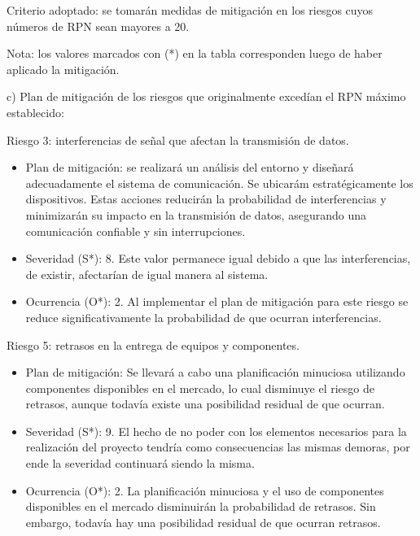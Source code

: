\documentclass[
11pt, %
]{charter}
\begin{document}
Criterio adoptado: se tomarán medidas de mitigación en los riesgos cuyos números de RPN sean mayores a 20.

Nota: los valores marcados con (*) en la tabla corresponden luego de haber aplicado la mitigación.


c) Plan de mitigación de los riesgos que originalmente excedían el RPN máximo establecido:
 

Riesgo 3: interferencias de señal que afectan la transmisión de datos.
\begin{itemize}
	\item Plan de mitigación: se realizará un análisis del entorno y diseñará adecuadamente el sistema de comunicación. Se ubicarám estratégicamente los dispositivos. Estas acciones reducirán la probabilidad de interferencias y minimizarán su impacto en la transmisión de datos, asegurando una comunicación confiable y sin interrupciones.
	\item Severidad (S*): 8. Este valor permanece igual debido a que las interferencias, de existir, afectarían de igual manera al sistema.
	\item Ocurrencia (O*): 2. Al implementar el plan de mitigación para este riesgo se reduce significativamente la probabilidad de que ocurran interferencias.
\end{itemize}

Riesgo 5: retrasos en la entrega de equipos y componentes.
\begin{itemize}
	\item Plan de mitigación: Se llevará a cabo una planificación minuciosa utilizando componentes disponibles en el mercado, lo cual disminuye el riesgo de retrasos, aunque todavía existe una posibilidad residual de que ocurran.
	\item Severidad (S*): 9. El hecho de no poder con los elementos necesarios para la realización del proyecto tendría como consecuencias las mismas demoras, por ende la severidad continuará siendo la misma.
	\item Ocurrencia (O*): 2. La planificación minuciosa y el uso de componentes disponibles en el mercado disminuirán la probabilidad de retrasos. Sin embargo, todavía hay una posibilidad residual de que ocurran retrasos.
\end{itemize}
\end{document}
